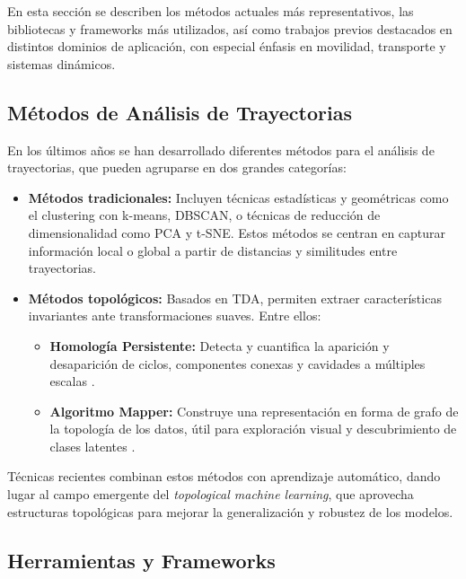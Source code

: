 En esta sección se describen los métodos actuales más representativos, las bibliotecas y frameworks más utilizados, así como trabajos previos destacados en distintos dominios de aplicación, con especial énfasis en movilidad, transporte y sistemas dinámicos.

\subsection{Métodos de Análisis de Trayectorias}

En los últimos años se han desarrollado diferentes métodos para el análisis de trayectorias, que pueden agruparse en dos grandes categorías:

\begin{itemize}
    \item \textbf{Métodos tradicionales:} Incluyen técnicas estadísticas y geométricas como el clustering con k-means, DBSCAN, o técnicas de reducción de dimensionalidad como PCA y t-SNE. Estos métodos se centran en capturar información local o global a partir de distancias y similitudes entre trayectorias.
    
    \item \textbf{Métodos topológicos:} Basados en TDA, permiten extraer características invariantes ante transformaciones suaves. Entre ellos:
    \begin{itemize}
        \item \textbf{Homología Persistente:} Detecta y cuantifica la aparición y desaparición de ciclos, componentes conexas y cavidades a múltiples escalas \cite{chazal2021introduction}.
        \item \textbf{Algoritmo Mapper:} Construye una representación en forma de grafo de la topología de los datos, útil para exploración visual y descubrimiento de clases latentes \cite{hensel2021survey}.
    \end{itemize}
\end{itemize}

Técnicas recientes combinan estos métodos con aprendizaje automático, dando lugar al campo emergente del \textit{topological machine learning}, que aprovecha estructuras topológicas para mejorar la generalización y robustez de los modelos. \cite{leykam2023topological}

\subsection{Herramientas y Frameworks} \label{Herramientas}

